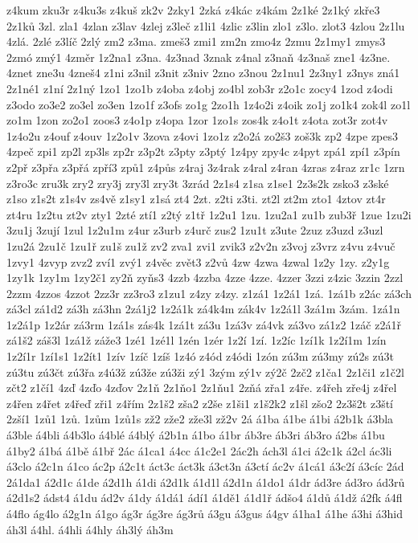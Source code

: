 {z4kum
zku3r
z4ku3s
z4kuš
zk2v
2zky1
2zká
z4kác
z4kám
2z1ké
2z1ký
zkře3
2z1ků
3zl.
zla1
4zlan
z3lav
4zlej
z3leč
z1li1
4zlic
z3lin
zlo1
z3lo.
zlot3
4zlou
2z1lu
4zlá.
2zlé
z3líč
2zlý
zm2
z3ma.
zmeš3
zmi1
zm2n
zmo4z
2zmu
2z1my1
zmys3
2zmó
zmý1
4změr
1z2na1
z3na.
4z3nad
3znak
z4nal
z3naň
4z3naš
zne1
4z3ne.
4znet
zne3u
4zneš4
z1ni
z3nil
z3nit
z3niv
2zno
z3nou
2z1nu1
2z3ny1
z3nys
zná1
2z1né1
z1ní
2z1ný
1zo1
1zo1b
z4oba
z4obj
zo4bl
zob3r
z2o1c
zocy4
1zod
z4odi
z3odo
zo3e2
zo3el
zo3en
1zo1f
z3ofs
zo1g
2zo1h
1z4o2i
z4oik
zo1j
zo1k4
zok4l
zo1l
zo1m
1zon
zo2o1
zoos3
z4o1p
z4opa
1zor
1zo1s
zos4k
z4o1t
z4ota
zot3r
zot4v
1z4o2u
z4ouf
z4ouv
1z2o1v
3zova
z4ovi
1zo1z
z2o2á
zo2š3
zoš3k
zp2
4zpe
zpes3
4zpeč
zpi1
zp2l
zp3ls
zp2r
z3p2t
z3pty
z3ptý
1z4py
zpy4c
z4pyt
zpá1
zpí1
z3pín
z2př
z3přa
z3přá
zpří3
způ1
z4půs
z4raj
3z4rak
z4ral
z4ran
4zras
z4raz
zr1c
1zrn
z3ro3c
zru3k
zry2
zry3j
zry3l
zry3t
3zrád
2z1s4
z1sa
z1se1
2z3s2k
zsko3
z3ské
z1so
z1s2t
z1s4v
zs4vě
z1sy1
z1sá
zt4
2zt.
z2ti
z3ti.
zt2l
zt2m
zto1
4ztov
zt4r
zt4ru
1z2tu
zt2v
zty1
2zté
ztí1
z2tý
z1tř
1z2u1
1zu.
1zu2a1
zu1b
zub3ř
1zue
1zu2i
3zu1j
3zují
1zul
1z2u1m
z4ur
z3urb
z4urč
zus2
1zu1t
z3ute
2zuz
z3uzd
z3uzl
1zu2á
2zu1č
1zu1ř
zu1š
zu1ž
zv2
zva1
zvi1
zvik3
z2v2n
z3voj
z3vrz
z4vu
z4vuč
1zvy1
4zvyp
zvz2
zví1
zvý1
z4věc
zvět3
z2vů
4zw
4zwa
4zwal
1z2y
1zy.
z2y1g
1zy1k
1zy1m
1zy2č1
zy2ň
zyňs3
4zzb
4zzba
4zze
4zze.
4zzer
3zzi
z4zic
3zzin
2zzl
2zzm
4zzos
4zzot
2zz3r
zz3ro3
z1zu1
z4zy
z4zy.
z1zá1
1z2á1
1zá.
1zá1b
z2ác
zá3ch
zá3cl
zá1d2
zá3h
zá3hn
2zá1j2
1z2á1k
zá4k4m
zák4v
1z2á1l
3zá1m
3zám.
1zá1n
1z2á1p
1z2ár
zá3rm
1zá1s
zás4k
1zá1t
zá3u
1zá3v
zá4vk
zá3vo
zá1z2
1záč
z2á1ř
zá1š2
záš3l
1zá1ž
záže3
1zé1
1zé1l
1zén
1zér
1z2í
1zí.
1z2íc
1zí1k
1z2í1m
1zín
1z2í1r
1zí1s1
1z2ít1
1zív
1zíč
1zíš
1z4ó
z4ód
z4ódi
1zón
zú3m
zú3my
zú2s
zú3t
zú3tu
zú3čt
zú3řa
z4ú3ž
zú3že
zú3ži
zý1
3zým
zý1v
zý2č
2zč2
z1ča1
2z1či1
z1č2l
zčt2
z1čí1
4zď
4zďo
4zďov
2z1ň
2z1ňo1
2z1ňu1
2zňá
zřa1
z4ře.
z4řeh
zře4j
z4řel
z4řen
z4řet
z4řeď
zři1
z4řím
2z1š2
zša2
z2še
z1ši1
z1š2k2
z1šl
zšo2
2z3š2t
z3ští
2zší1
1zů1
1zů.
1zům
1zů1s
zž2
zže2
zže3l
zž2v
2á
á1ba
á1be
á1bi
á2b1k
á3bla
á3ble
á4bli
á4b3lo
á4blé
á4blý
á2b1n
á1bo
á1br
áb3re
áb3ri
áb3ro
á2bs
á1bu
á1by2
á1bá
á1bě
á1bř
2ác
á1ca1
á4cc
á1c2e1
2ác2h
ách3l
á1ci
á2c1k
á2cl
ác3li
á3clo
á2c1n
á1co
ác2p
á2c1t
áct3c
áct3k
á3ct3n
á3ctí
ác2v
á1cá1
á3c2í
á3cíc
2ád
2á1da1
á2d1c
á1de
á2d1h
á1di
á2d1k
á1d1l
á2d1n
á1do1
á1dr
ád3re
ád3ro
ád3rů
á2d1s2
ádst4
á1du
ád2v
á1dy
á1dá1
ádí1
á1dě1
á1d1ř
ádšo4
á1dů
á1dž
á2fk
á4fl
á4flo
ág4lo
á2g1n
á1go
ág3r
ág3re
ág3rů
á3gu
á3gus
á4gv
á1ha1
á1he
á3hi
á3hid
áh3l
á4hl.
á4hli
á4hly
áh3lý
áh3m
}

